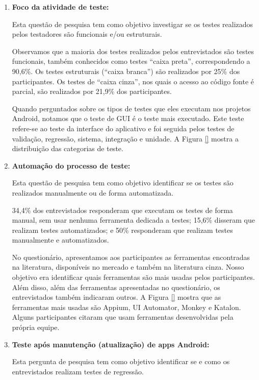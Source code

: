 \begin{enumerate}[label=\bf QP\arabic*]
    
\item \textbf{Foco da atividade de teste:}
    
Esta questão de pesquisa tem como objetivo investigar se os testes realizados pelos testadores são funcionais e/ou estruturais. 
    
Observamos que a maioria dos testes realizados pelos entrevistados são testes funcionais, também conhecidos como testes “caixa preta”, correspondendo a 90,6\%. Os testes estruturais (“caixa branca”) são realizados por 25\% dos participantes. Os testes de “caixa cinza”, nos quais o acesso ao código fonte é parcial, são realizados por 21,9\% dos participantes. 
    
Quando perguntados sobre os tipos de testes que eles executam nos projetos Android, notamos que o teste de \ac{GUI} é o teste mais executado. Este teste refere-se ao teste da interface do aplicativo e foi seguida pelos testes de validação, regressão, sistema, integração e unidade. A Figura \ref{} mostra a distribuição das categorias de teste.
    
\item \textbf{Automação do processo de teste:}

Esta questão de pesquisa tem como objetivo identificar se os testes são realizados manualmente ou de forma automatizada. 
    
34,4\% dos entrevistados responderam que executam os testes de forma manual, sem usar nenhuma ferramenta dedicada a testes; 15,6\% disseram que realizam testes automatizados; e 50\% responderam que realizam testes manualmente e automatizados. 
    
No questionário, apresentamos aos participantes as ferramentas encontradas na literatura, disponíveis no mercado e também na literatura cinza. Nosso objetivo era identificar quais ferramentas são mais usadas pelos participantes. Além disso, além das ferramentas apresentadas no questionário, os entrevistados também indicaram outros. A Figura \ref{} mostra que as ferramentas mais usadas são Appium, UI Automator, Monkey e Katalon. Alguns participantes citaram que usam ferramentas desenvolvidas pela própria equipe.
    
\item \textbf{Teste após manutenção (atualização) de apps Android:}

Esta pergunta de pesquisa tem como objetivo identificar se e como os entrevistados realizam testes de regressão.


\end{enumerate}
